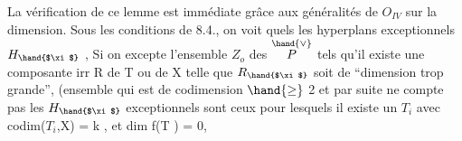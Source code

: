 La vérification de ce lemme est immédiate grâce aux généralités
de $O_{IV}$ sur la dimension. Sous les conditions de 8.4., on voit  quels 
les hyperplans exceptionnels $H_{\hand{$\xi$}}$ 
, Si
on excepte l'ensemble $Z_o$ des \hand{$\xi\in$} $\overset{\hand{\vee}}{P}$ tels qu'il existe une composante
irr R de T ou de X telle  que $R_{\hand{$\xi$}}$ soit de ``dimension trop grande'',
 (ensemble qui est de codimension $\hand{\geq}$ 2 et par suite ne compte pas
les $H_{\hand{$\xi$}}$  exceptionnels sont ceux pour lesquels il existe
un $T_i$ avec codim($T_i$,X) = k , et  dim f(T ) = 0,

